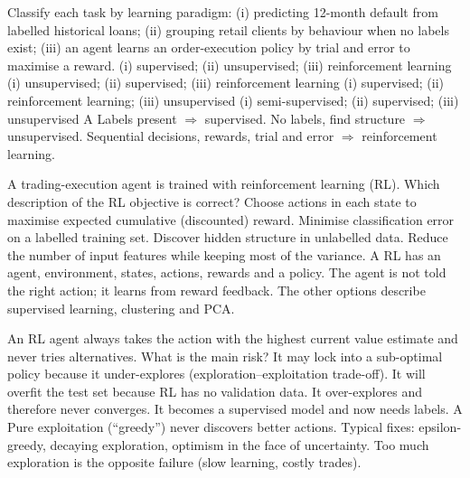 {Classify each task by learning paradigm: (i) predicting 12-month default from labelled historical loans; (ii) grouping retail clients by behaviour when no labels exist; (iii) an agent learns an order-execution policy by trial and error to maximise a reward.}
{(i) supervised; (ii) unsupervised; (iii) reinforcement learning}
{(i) unsupervised; (ii) supervised; (iii) reinforcement learning}
{(i) supervised; (ii) reinforcement learning; (iii) unsupervised}
{(i) semi-supervised; (ii) supervised; (iii) unsupervised}
{A}
{Labels present $\Rightarrow$ supervised. No labels, find structure $\Rightarrow$ unsupervised. Sequential decisions, rewards, trial and error $\Rightarrow$ reinforcement learning.}

{A trading-execution agent is trained with reinforcement learning (RL). Which description of the RL objective is correct?}
{Choose actions in each state to maximise expected cumulative (discounted) reward.}
{Minimise classification error on a labelled training set.}
{Discover hidden structure in unlabelled data.}
{Reduce the number of input features while keeping most of the variance.}
{A}
{RL has an agent, environment, states, actions, rewards and a policy. The agent is not told the right action; it learns from reward feedback. The other options describe supervised learning, clustering and PCA.}

{An RL agent always takes the action with the highest current value estimate and never tries alternatives. What is the main risk?}
{It may lock into a sub-optimal policy because it under-explores (exploration--exploitation trade-off).}
{It will overfit the test set because RL has no validation data.}
{It over-explores and therefore never converges.}
{It becomes a supervised model and now needs labels.}
{A}
{Pure exploitation (``greedy'') never discovers better actions. Typical fixes: epsilon-greedy, decaying exploration, optimism in the face of uncertainty. Too much exploration is the opposite failure (slow learning, costly trades).}

